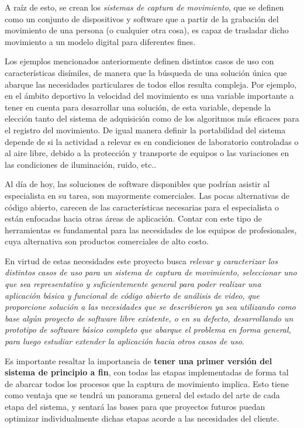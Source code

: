 A raíz de esto, se crean los \emph{sistemas de captura de movimiento}, que se definen como un conjunto de dispositivos y software que a partir de la grabación del movimiento de una persona (o cualquier otra cosa), es capaz de trasladar dicho movimiento a un modelo digital para diferentes fines.

Los ejemplos mencionados anteriormente definen distintos casos de uso con características disímiles, de manera que la búsqueda de una solución única que abarque las necesidades particulares de todos ellos resulta compleja. Por ejemplo, en el ámbito deportivo la velocidad del movimiento es una variable importante a tener en cuenta para desarrollar una solución, de esta variable, depende la elección tanto del sistema de adquisición como de los algoritmos más eficaces para el registro del movimiento.  De igual manera definir la portabilidad del sistema depende de si la actividad a relevar es en condiciones de laboratorio controladas o al aire libre, debido a la protección y transporte de equipos o las variaciones en las condiciones de iluminación, ruido, etc..

Al  día  de  hoy,  las  soluciones  de  software  disponibles que  podrían  asistir al especialista en su tarea, son mayormente comerciales. Las pocas alternativas de código abierto, carecen de las características necesarias para el especialista o están enfocadas hacia otras áreas de aplicación. Contar con este tipo de herramientas es fundamental para las necesidades de los equipos de profesionales, cuya alternativa son productos comerciales de alto costo.

En virtud de estas necesidades este proyecto busca \emph{relevar y caracterizar los distintos casos de uso para un sistema de captura de movimiento,  seleccionar uno que sea representativo y suficientemente general para poder realizar una aplicación básica y funcional de código abierto de análisis de video, que proporcione solución a las necesidades que se describieron ya sea utilizando como base algún  proyecto  de  software  libre  existente,  o en su defecto, desarrollando un prototipo de software básico completo que abarque el problema en forma general, para luego estudiar extender la aplicación hacia otros casos de uso}.

Es importante resaltar la importancia de \textbf{tener una primer versión del sistema de principio a fin}, con todas las etapas implementadas de forma tal de abarcar todos los procesos que la captura de movimiento implica.  Esto tiene como ventaja que se tendrá un panorama general del estado del arte de cada etapa del sistema, y 
sentará las bases para que proyectos futuros puedan optimizar individualmente dichas etapas acorde a las necesidades del cliente.

